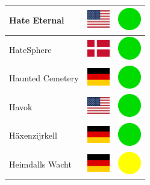 \documentclass[12pt, a4paper, twoside]{report}
\begin{document}
\begin{center}
\begin{longtable}{|p{5cm}|p{2cm}|p{2cm}|}
 Hate Eternal                                               & \includegraphics[width=1cm]{../img/flags/us} &   \includegraphics[width=1cm]{../likes/y} \\ \hline
 HateSphere                                                 & \includegraphics[width=1cm]{../img/flags/dk} &   \includegraphics[width=1cm]{../likes/y} \\ \hline
 Haunted Cemetery                                           & \includegraphics[width=1cm]{../img/flags/de} &   \includegraphics[width=1cm]{../likes/y} \\ \hline
 Havok                                                      & \includegraphics[width=1cm]{../img/flags/us} &   \includegraphics[width=1cm]{../likes/y} \\ \hline
 Häxenzijrkell                                              & \includegraphics[width=1cm]{../img/flags/de} &   \includegraphics[width=1cm]{../likes/y} \\ \hline
 Heimdalls Wacht                                            & \includegraphics[width=1cm]{../img/flags/de} &   \includegraphics[width=1cm]{../likes/m} \\ \hline

\end{longtable}
\end{center}
\end{document}
